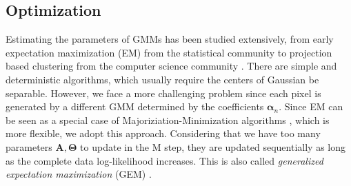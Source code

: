 \documentclass[twocolumn,english]{IEEEtran}
\theoremstyle{plain}
\begin{document}
\subsection{Optimization}

Estimating the parameters of GMMs has been studied extensively, from
early expectation maximization (EM) from the statistical community
to projection based clustering from the computer science community
\cite{achlioptas2005spectral,vlassis2002greedy}. There are simple
and deterministic algorithms, which usually require the centers of
Gaussian be separable. However, we face a more challenging problem
since each pixel is generated by a different GMM determined by the
coefficients $\boldsymbol{\alpha}_{n}$. Since EM can be seen as a
special case of Majoriziation-Minimization algorithms \cite{langeOptimization},
which is more flexible, we adopt this approach. Considering that we
have too many parameters $\mathbf{A},\boldsymbol{\Theta}$ to update
in the M step, they are updated sequentially as long as the complete
data log-likelihood increases. This is also called \emph{generalized
expectation maximization} (GEM) \cite{meng1993maximum}.
\end{document}
